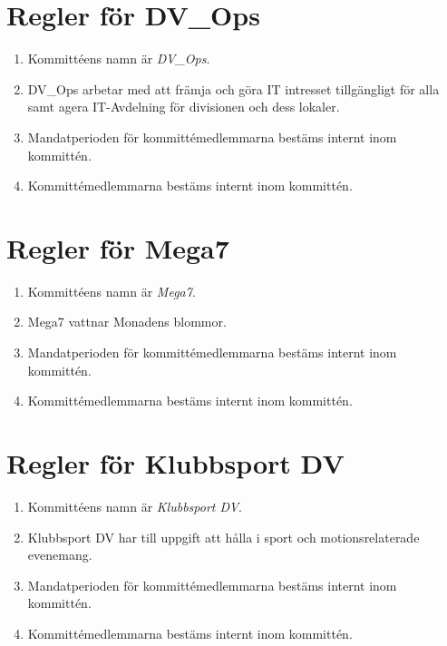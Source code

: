 \documentclass{dvd}
\begin{document}
\section{Regler för DV\_Ops}

\begin{enumerate}[label=\arabic* §, ref=\arabic*]
	\item Kommittéens namn är \emph{DV\_Ops}.

	\item DV\_Ops arbetar med att främja och göra IT intresset tillgängligt för alla samt agera IT-Avdelning för divisionen och dess lokaler.

	\item Mandatperioden för kommittémedlemmarna bestäms internt inom kommittén.

	\item Kommittémedlemmarna bestäms internt inom kommittén.
\end{enumerate}

\section{Regler för Mega7}

\begin{enumerate}[label=\arabic* §, ref=\arabic*]
	\item Kommittéens namn är \emph{Mega7}.

	\item Mega7 vattnar Monadens blommor.

	\item Mandatperioden för kommittémedlemmarna bestäms internt inom kommittén.

	\item Kommittémedlemmarna bestäms internt inom kommittén.
\end{enumerate}

\section{Regler för Klubbsport DV}

\begin{enumerate}[label=\arabic* §, ref=\arabic*]
	\item Kommittéens namn är \emph{Klubbsport DV}.

	\item Klubbsport DV har till uppgift att hålla i sport och motionsrelaterade evenemang.

	\item Mandatperioden för kommittémedlemmarna bestäms internt inom kommittén.

	\item Kommittémedlemmarna bestäms internt inom kommittén.
\end{enumerate}
\end{document}
